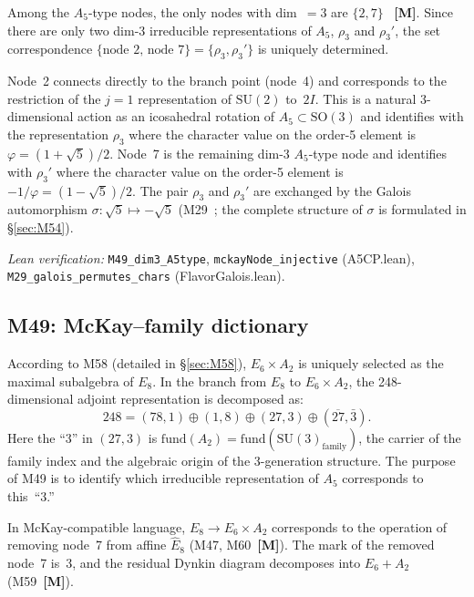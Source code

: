 \documentclass[sn-mathphys-num,Numbered]{sn-jnl}
\theoremstyle{thmstyleone}
\theoremstyle{thmstylethree}
\newcommand{\SU}{\mathrm{SU}}
\newcommand{\SO}{\mathrm{SO}}
\newcommand{\Ehat}{\hat{E}}
\newcommand{\layerM}{\textbf{[M]}}
\begin{document}
Among the $A_5$-type nodes, the only nodes with dim~$= 3$ are $\{2, 7\}$~%
\layerM.  Since there are only two dim-3 irreducible representations of
$A_5$, $\rho_3$ and $\rho_3'$, the set correspondence
$\{\text{node~2, node~7}\} = \{\rho_3, \rho_3'\}$ is uniquely determined.

Node~2 connects directly to the branch point (node~4) and corresponds to the
restriction of the $j = 1$ representation of $\SU(2)$ to~$2I$.  This is a
natural 3-dimensional action as an icosahedral rotation of $A_5 \subset \SO(3)$
and identifies with the representation $\rho_3$ where the character value on
the order-5 element is $\varphi = (1+\sqrt{5})/2$.  Node~7 is the remaining
dim-3 $A_5$-type node and identifies with $\rho_3'$ where the character value
on the order-5 element is $-1/\varphi = (1-\sqrt{5})/2$.  The pair $\rho_3$
and $\rho_3'$ are exchanged by the Galois automorphism $\sigma\colon
\sqrt{5}\mapsto -\sqrt{5}$ (M29~\cite{Paper1}; the complete structure of
$\sigma$ is formulated in \S\ref{sec:M54}).

\noindent\textit{Lean verification:}
\texttt{M49\_dim3\_A5type}, \texttt{mckayNode\_injective} (A5CP.lean),
\texttt{M29\_galois\_permutes\_chars} (FlavorGalois.lean).


\subsection{M49: McKay--family dictionary}\label{sec:M49}

According to M58 (detailed in \S\ref{sec:M58}), $E_6 \times A_2$ is uniquely
selected as the maximal subalgebra of $E_8$.  In the branch from $E_8$ to
$E_6 \times A_2$, the 248-dimensional adjoint representation is decomposed as:
\begin{equation}\label{eq:248branch}
  248 = (78,1) \oplus (1,8) \oplus (27,3) \oplus (\overline{27},\bar{3}).
\end{equation}
Here the ``3'' in $(27,3)$ is $\mathrm{fund}(A_2) =
\mathrm{fund}(\SU(3)_{\mathrm{family}})$, the carrier of the family index
and the algebraic origin of the 3-generation structure.  The purpose of M49 is
to identify which irreducible representation of $A_5$ corresponds to this~``3.''

In McKay-compatible language, $E_8 \to E_6 \times A_2$ corresponds to the
operation of removing node~7 from affine $\Ehat_8$ (M47, M60~\layerM).  The
mark of the removed node~7 is~3, and the residual Dynkin diagram decomposes
into $E_6 + A_2$ (M59~\layerM).
\end{document}
